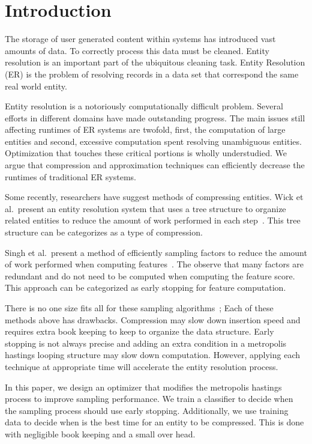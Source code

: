 
\section{Introduction}

The storage of user generated content within systems has introduced 
vast amounts of data.
To correctly process this data must be cleaned. 
Entity resolution is an important part of the ubiquitous cleaning task.
Entity Resolution (ER) is the problem of resolving records in
a data set that correspond the same real world entity.

Entity resolution is a notoriously computationally difficult problem.
Several efforts in different domains have made outstanding progress.
The main issues still affecting runtimes of ER systems are
twofold, first, the computation of large entities and second, excessive
computation spent resolving unambiguous entities.
Optimization that touches these critical portions is wholly understudied.
We argue that compression and approximation 
techniques can efficiently decrease the runtimes of traditional ER systems.


Some recently, researchers have suggest methods of compressing entities.
Wick et al.\ present an entity resolution system that uses a tree structure
to organize related entities to reduce the amount of work performed in each step~\cite{wick2013discriminative}.
This tree structure can be categorizes as a type of compression.

Singh et al.\ present a method of efficiently sampling factors to reduce the amount of work performed when computing features~\cite{singh2012monte}.
The observe that many factors are redundant and do not need to be computed when computing the feature score.
This approach can be categorized as early stopping for feature computation.

There is no one size fits all for these sampling algorithms~\cite{sculley2006compression};
Each of these methods above has drawbacks.
Compression may slow down insertion speed and requires extra book keeping to keep to organize the data structure.
Early stopping is not always precise and adding an extra condition in a metropolis hastings looping structure may slow down computation.
However, applying each technique at appropriate time will accelerate the entity resolution process.

In this paper, we design an optimizer that modifies the metropolis hastings process to improve sampling performance.
We train a classifier to decide when the sampling process should use early stopping.
Additionally, we use training data to decide when is the best time for an entity to be compressed.
This is done with negligible book keeping and a small over head.

